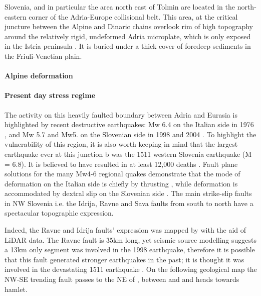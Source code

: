 Slovenia, and in particular the area north east of Tolmin are located in the north-eastern corner of the Adria-Europe collisional belt. 
This area, at the critical juncture between the Alpine and Dinaric chains overlook rim of high topography around the relatively rigid, undeformed Adria microplate, which is only exposed in the Istria peninsula \citep{vsmuc2009tectonic}. 
It is buried under a thick cover of foredeep sediments in the Friuli-Venetian plain. 

\paragraph{Alpine deformation}
\label{par:alpine deformation}



\paragraph{Present day stress regime}
\label{par:present day stress regime}
The activity on this heavily faulted boundary between Adria and Eurasia is highlighted by recent destructive earthquakes: Mw 6.4 on the Italian side in 1976 \citep{pondrelli2001seismotectonic}, and Mw 5.7 and Mw5. on the Slovenian side in 1998 \citep{bajc20011998} and 2004 \citep{aoudia2005july}. 
To highlight the vulnerability of this region, it is also worth keeping in mind that the largest earthquake ever at this junction b was the 1511 western Slovenia earthquake (M = 6.8). It is believed to have resulted in at least 12,000 deaths \citep{fitzko2005constraints}.
Fault plane solutions for the many Mw4-6 regional quakes demonstrate that the mode of deformation on the Italian side is chiefly by thrusting \citep{poli2002new}, while deformation is accommodated by dextral slip on the Slovenian side \citep{poljak2000seismotectonic}. 
The main strike-slip faults in NW Slovenia i.e. the Idrija, Ravne and Sava faults from south to north have a spectacular topographic expression. 

Indeed, the Ravne and Idrija faults' expression was mapped by \citet{cunningham2006application} with the aid of LiDAR data. The Ravne fault is \~35km long, yet seismic source modelling suggests a 13km only segment was involved in the 1998 earthquake, therefore it is possible that this fault generated stronger earthquakes in the past; it is thought it was involved in the devastating 1511 earthquake \citet{fitzko2005constraints}.
On the following geological map  the NW-SE trending fault passes to the NE of , between  and  and heads towards  hamlet.

